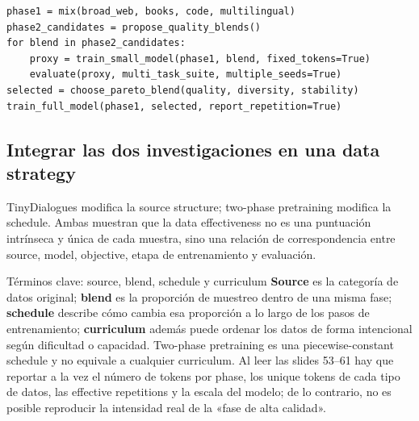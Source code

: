 
\begin{lstlisting}[caption={Esqueleto de experimento reproducible para una two-phase data schedule}]
phase1 = mix(broad_web, books, code, multilingual)
phase2_candidates = propose_quality_blends()
for blend in phase2_candidates:
    proxy = train_small_model(phase1, blend, fixed_tokens=True)
    evaluate(proxy, multi_task_suite, multiple_seeds=True)
selected = choose_pareto_blend(quality, diversity, stability)
train_full_model(phase1, selected, report_repetition=True)
\end{lstlisting}

\subsection{Integrar las dos investigaciones en una data strategy}

TinyDialogues modifica la source structure; two-phase pretraining modifica la schedule. Ambas muestran que la data effectiveness no es una puntuación intrínseca y única de cada muestra, sino una relación de correspondencia entre source, model, objective, etapa de entrenamiento y evaluación.







\begin{knowledgebox}{Términos clave: source, blend, schedule y curriculum}
\textbf{Source} es la categoría de datos original; \textbf{blend} es la proporción de muestreo dentro de una misma fase; \textbf{schedule} describe cómo cambia esa proporción a lo largo de los pasos de entrenamiento; \textbf{curriculum} además puede ordenar los datos de forma intencional según dificultad o capacidad. Two-phase pretraining es una piecewise-constant schedule y no equivale a cualquier curriculum. Al leer las slides 53--61 hay que reportar a la vez el número de tokens por phase, los unique tokens de cada tipo de datos, las effective repetitions y la escala del modelo; de lo contrario, no es posible reproducir la intensidad real de la «fase de alta calidad».
\end{knowledgebox}

